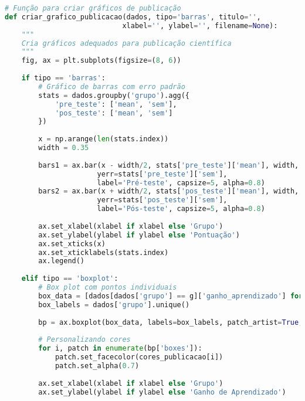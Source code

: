 \begin{pythonbox}
\begin{lstlisting}[language=Python]
# Função para criar gráficos de publicação
def criar_grafico_publicacao(dados, tipo='barras', titulo='', 
                            xlabel='', ylabel='', filename=None):
    """
    Cria gráficos adequados para publicação científica
    """
    fig, ax = plt.subplots(figsize=(8, 6))
    
    if tipo == 'barras':
        # Gráfico de barras com erro padrão
        stats = dados.groupby('grupo').agg({
            'pre_teste': ['mean', 'sem'],
            'pos_teste': ['mean', 'sem']
        })
        
        x = np.arange(len(stats.index))
        width = 0.35
        
        bars1 = ax.bar(x - width/2, stats['pre_teste']['mean'], width, 
                      yerr=stats['pre_teste']['sem'], 
                      label='Pré-teste', capsize=5, alpha=0.8)
        bars2 = ax.bar(x + width/2, stats['pos_teste']['mean'], width,
                      yerr=stats['pos_teste']['sem'],
                      label='Pós-teste', capsize=5, alpha=0.8)
        
        ax.set_xlabel(xlabel if xlabel else 'Grupo')
        ax.set_ylabel(ylabel if ylabel else 'Pontuação')
        ax.set_xticks(x)
        ax.set_xticklabels(stats.index)
        ax.legend()
        
    elif tipo == 'boxplot':
        # Box plot com pontos individuais
        box_data = [dados[dados['grupo'] == g]['ganho_aprendizado'] for g in dados['grupo'].unique()]
        box_labels = dados['grupo'].unique()
        
        bp = ax.boxplot(box_data, labels=box_labels, patch_artist=True, showmeans=True)
        
        # Personalizando cores
        for i, patch in enumerate(bp['boxes']):
            patch.set_facecolor(cores_publicacao[i])
            patch.set_alpha(0.7)
        
        ax.set_xlabel(xlabel if xlabel else 'Grupo')
        ax.set_ylabel(ylabel if ylabel else 'Ganho de Aprendizado')
           \end{lstlisting}
\end{pythonbox}

